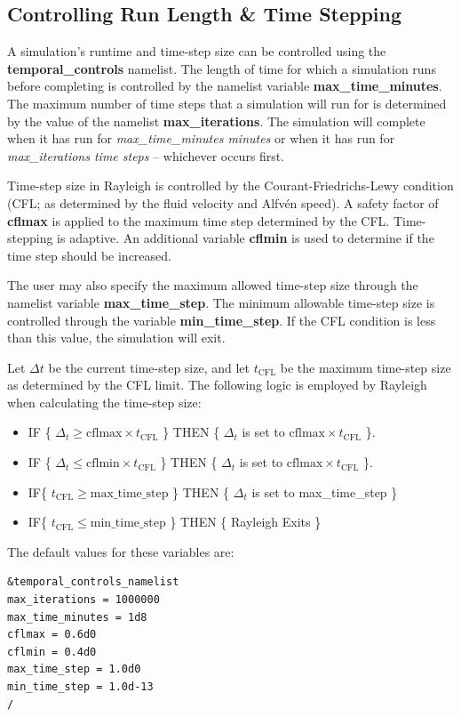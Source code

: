 \subsection{Controlling Run Length \& Time Stepping}

A simulation's runtime and time-step size can be controlled using the \textbf{temporal\_controls} namelist.  The length of time for which a simulation runs before completing is controlled by the namelist variable \textbf{max\_time\_minutes}.  The maximum number of time steps that a simulation will run for is determined by the value of the namelist \textbf{max\_iterations}.  The simulation will complete when it has run for \textit{max\_time\_minutes minutes} or when it has run for \textit{max\_iterations time steps} -- whichever occurs first.

Time-step size in Rayleigh is controlled by the Courant-Friedrichs-Lewy condition (CFL; as determined by the fluid velocity and Alfv\'{e}n speed).  A safety factor of \textbf{cflmax} is applied to the maximum time step determined by the CFL.  Time-stepping is adaptive.  An additional variable \textbf{cflmin} is used to determine if the time step should be increased.  

The user may also specify the maximum allowed time-step size through the namelist variable \textbf{max\_time\_step}.  The minimum allowable time-step size is controlled through the variable \textbf{min\_time\_step}.  If the CFL condition is less than this value, the simulation will exit.

Let $\Delta t$ be the current time-step size, and let $t_\mathrm{CFL}$ be the maximum time-step size as determined by the CFL limit.  The following logic is employed by Rayleigh when calculating the time-step size:
\begin{itemize}
\item IF \{ $\Delta_t\ge \mathrm{cflmax}\times t_\mathrm{CFL}$ \} THEN \{ $\Delta_t$ is set to $\mathrm{cflmax}\times t_\mathrm{CFL}$ \}.
\item IF \{ $\Delta_t\le \mathrm{cflmin}\times t_\mathrm{CFL}$ \} THEN \{ $\Delta_t$ is set to $\mathrm{cflmax}\times t_\mathrm{CFL}$ \}.
\item IF\{ $t_\mathrm {CFL}\ge \mathrm{max\_time\_step} $ \} THEN \{ $\Delta_t$ is set to max\_time\_step \}
\item IF\{ $t_\mathrm {CFL}\le \mathrm{min\_time\_step} $ \} THEN \{ Rayleigh Exits \}
\end{itemize}

The default values for these variables are:
\begin{lstlisting}
&temporal_controls_namelist
max_iterations = 1000000
max_time_minutes = 1d8
cflmax = 0.6d0
cflmin = 0.4d0
max_time_step = 1.0d0
min_time_step = 1.0d-13
/
\end{lstlisting}


